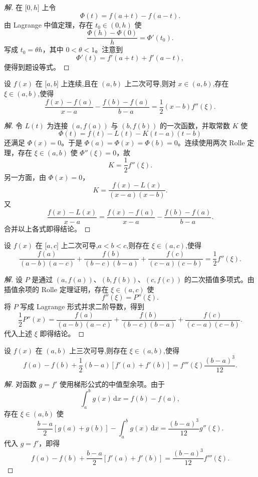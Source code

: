 \documentclass[../../数学分析培优讲义(答案版).tex]{subfiles}
\begin{document}
\begin{proof}[解]
在 $\lbrack0,h\rbrack$ 上令
\[
    \Phi(t)=f(a+t)-f(a-t).
\]
由 Lagrange 中值定理，存在 $t_0\in(0,h)$ 使
\[
    \dfrac{\Phi(h)-\Phi(0)}{h}=\Phi'(t_0).
\]
写成 $t_0=\theta h$，其中 $0<\theta<1$。注意到
\[
    \Phi'(t)=f'(a+t)+f'(a-t),
\]
便得到题设等式。
\end{proof}

\begin{example}
设 $f(x)$ 在 $\lbrack a,b\rbrack$ 上连续,且在 $(a,b)$ 上二次可导,则对 $x\in(a,b)$,存在 $\xi\in(a,b)$,使得
\[
    \dfrac{f(x)-f(a)}{x-a}
    -\dfrac{f(b)-f(a)}{b-a}
    =\dfrac{1}{2}(x-b)f''(\xi).
\]
\end{example}

\begin{proof}[解]
令 $L(t)$ 为连接 $(a,f(a))$ 与 $(b,f(b))$ 的一次函数，并取常数 $K$ 使
\[
    \Phi(t)=f(t)-L(t)-K(t-a)(t-b)
\]
还满足 $\Phi(x)=0$。于是 $\Phi(a)=\Phi(x)=\Phi(b)=0$。连续使用两次 Rolle 定理，存在 $\xi\in(a,b)$ 使 $\Phi''(\xi)=0$，故
\[
    K=\dfrac{1}{2}f''(\xi).
\]
另一方面，由 $\Phi(x)=0$，
\[
    K=\dfrac{f(x)-L(x)}{(x-a)(x-b)}.
\]
又
\[
    \dfrac{f(x)-L(x)}{x-a}
    =\dfrac{f(x)-f(a)}{x-a}
    -\dfrac{f(b)-f(a)}{b-a}.
\]
合并以上各式即得结论。
\end{proof}

\begin{example}
设 $f(x)$ 在 $\lbrack a,c\rbrack$ 上二次可导,$a<b<c$,则存在 $\xi\in(a,c)$,使得
\[
    \dfrac{f(a)}{(a-b)(a-c)}
    +\dfrac{f(b)}{(b-c)(b-a)}
    +\dfrac{f(c)}{(c-a)(c-b)}
    =\dfrac{1}{2}f''(\xi).
\]
\end{example}

\begin{proof}[解]
设 $P$ 是通过 $(a,f(a))$、$(b,f(b))$、$(c,f(c))$ 的二次插值多项式。由插值余项的 Rolle 定理证明，存在 $\xi\in(a,c)$ 使
\[
    f''(\xi)=P''(\xi).
\]
将 $P$ 写成 Lagrange 形式并求二阶导数，得到
\[
    \dfrac{1}{2}P''(x)
    =\dfrac{f(a)}{(a-b)(a-c)}
    +\dfrac{f(b)}{(b-c)(b-a)}
    +\dfrac{f(c)}{(c-a)(c-b)}.
\]
代入上述 $\xi$ 即得结论。
\end{proof}

\begin{example}
设 $f(x)$ 在 $(a,b)$ 上三次可导,则存在 $\xi\in(a,b)$,使得
\[
    f(a)-f(b)+\dfrac{1}{2}(b-a)[f'(a)+f'(b)]
    =f'''(\xi)\dfrac{(b-a)^3}{12}.
\]
\end{example}

\begin{proof}[解]
对函数 $g=f'$ 使用梯形公式的中值型余项。由于
\[
    \int_a^b g(x)\,\mathrm{d}x=f(b)-f(a),
\]
存在 $\xi\in(a,b)$ 使
\[
    \dfrac{b-a}{2}[g(a)+g(b)]
    -\int_a^b g(x)\,\mathrm{d}x
    =\dfrac{(b-a)^3}{12}g''(\xi).
\]
代入 $g=f'$，即得
\[
    f(a)-f(b)+\dfrac{b-a}{2}[f'(a)+f'(b)]
    =\dfrac{(b-a)^3}{12}f'''(\xi).
\]
\end{proof}
\end{document}
